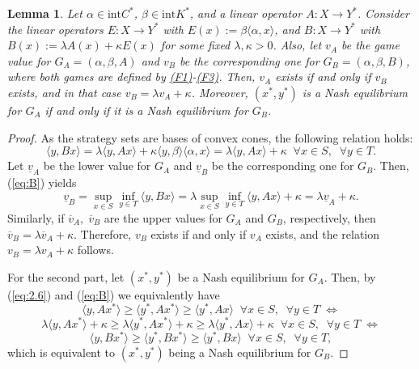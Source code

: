 \documentclass[11pt, twoside]{article}
\numberwithin{equation}{section}
\newtheorem{lemma}{Lemma}[section]
\theoremstyle{definition}
\begin{document}
\begin{lemma}\label{lem:3.6}
     Let $\alpha\in \text{int}C^*$, $\beta\in \text{int}K^*$, and a linear operator $A:X\rightarrow Y^*$. Consider the linear operators $E:X\rightarrow Y^*$ with $E(x):= \beta\langle\alpha,x\rangle$, and $B:X\rightarrow Y^*$ with $B(x):=\lambda A(x)+\kappa E(x)$ for some fixed $\lambda,\kappa >0$. Also, let $v_A$ be the game value for $G_A=(\alpha,\beta,A)$ and $v_B$ be the corresponding one for $G_B=(\alpha,\beta,B)$, where both games are defined by \hyperlink{f1}{(F1)}-\hyperlink{f3}{(F3)}. Then, $v_A$ exists if and only if $v_B$ exists, and in that case $v_B=\lambda v_A+\kappa$. Moreover, $(x^*,y^*)$ is a Nash equilibrium for $G_A$ if and only if it is a Nash equilibrium for $G_B$.
\end{lemma}
\begin{proof}
As the strategy sets are bases of convex cones, the following relation holds:
\begin{equation}\label{eq:B}
    \langle y,Bx\rangle=\lambda\langle y,Ax\rangle +\kappa\langle y,\beta\rangle\langle \alpha,x\rangle=\lambda\langle y,Ax\rangle+\kappa\;\;\forall x\in S,\;\;\forall y\in T.
\end{equation}
Let $\underline{v}_A$ be the lower value for $G_A$ and $\underline{v}_B$ be the corresponding one for $G_B$. Then, (\ref{eq:B}) yields
\begin{equation*}
    \underline{v}_B=\sup_{x\in S}\inf_{y\in T}\langle y,Bx\rangle=\lambda\sup_{x\in S}\inf_{y\in T}\langle y,Ax\rangle +\kappa =\lambda\underline{v}_A+\kappa.
\end{equation*}
Similarly, if $\overline{v}_A,\;\overline{v}_B$ are the upper values for $G_A$ and $G_B$, respectively, then $\overline{v}_B=\lambda\overline{v}_A+\kappa$. Therefore, $v_B$ exists if and only if $v_A$ exists, and the relation $v_B=\lambda v_A+\kappa$ follows.\par
For the second part, let $(x^*,y^*)$ be a Nash equilibrium for $G_A$. Then, by (\ref{eq:2.6}) and (\ref{eq:B}) we equivalently have
\begin{equation*}
    \langle y,Ax^*\rangle\geq\langle y^*,Ax^*\rangle\geq\langle y^*,Ax\rangle\;\;\forall x\in S,\;\;\forall y\in T\;\Leftrightarrow
\end{equation*}
\begin{equation*}
    \lambda\langle y,Ax^*\rangle+\kappa\geq\lambda\langle y^*,Ax^*\rangle+\kappa\geq\lambda\langle y^*,Ax\rangle+\kappa\;\;\forall x\in S,\;\;\forall y\in T\;\Leftrightarrow
\end{equation*}
\begin{equation*}
    \langle y,Bx^*\rangle\geq\langle y^*,Bx^*\rangle\geq\langle y^*,Bx\rangle\;\;\forall x\in S,\;\;\forall y\in T,
\end{equation*}
which is equivalent to $(x^*,y^*)$ being a Nash equilibrium for $G_B$.
\end{proof}
\end{document}
